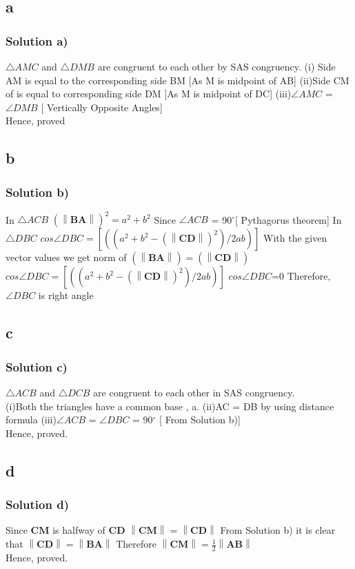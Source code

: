 \documentclass{beamer}
\newcommand\norm[1]{\left\lVert#1\right\rVert}
\renewcommand{\vec}[1]{\mathbf{#1}}
\begin{document}
\subsection{a}
\begin{frame}
\frametitle{Solution a)}
\footnotesize
\label{a}

$\triangle AMC$ and $\triangle DMB$ are congruent to each other by SAS congruency.
\newline
(i) Side AM  is equal to the corresponding side BM  [As M is midpoint of AB]
\newline
(ii)Side CM of is equal to corresponding side DM [As M is midpoint of DC]
\newline
(iii)$\angle AMC$ = $\angle DMB$ [ Vertically Opposite Angles]
\\
Hence, proved
\end{frame}
\subsection{b}
\begin{frame}
\frametitle{Solution b)}
\footnotesize
\label{b}
In $\triangle ACB$  $(\norm{\vec{BA}})^2= a^2+b^2$
Since $\angle ACB$ = 90$^{\circ}$[ Pythagorus theorem]
\newline
In $\triangle DBC$ 
$cos \angle DBC= [((a^2+b^2-(\norm{\vec{CD}})^2)/2ab)] $
With the given vector values we get norm of $(\norm{\vec{BA}})=(\norm{\vec{CD}})$
\newline
$cos\angle DBC =[((a^2+b^2-(\norm{\vec{CD}})^2)/2ab)]$
$cos\angle DBC$=0
\newline
Therefore, $\angle DBC$ is right angle
\end{frame}
\subsection{c}
\begin{frame}
\frametitle{Solution c)}
\footnotesize
\label{c}
$\triangle ACB$ and $\triangle DCB$ are congruent to each other in SAS congruency.
\\
(i)Both the triangles have a common base , a.
\newline
(ii)AC = DB by using distance formula
\newline
(iii)$\angle ACB$ = $\angle DBC$ = 90$^{\circ}$ [ From Solution b)]
\\
Hence, proved.

\end{frame}
\subsection{d}
\begin{frame}
\frametitle{Solution d)}
\footnotesize
\label{d}
Since $\vec{CM}$ is halfway of $\vec{CD}$
\newline
$\norm{\vec{CM}}=\norm{\vec{CD}}$
\newline
From Solution b) it is clear that $\norm{\vec{CD}}=\norm{\vec{BA}}$
\newline
Therefore $\norm{\vec{CM}}=\frac{1}{2}\norm{\vec{AB}}$
\\
Hence, proved.
\end{frame}
\end{document}
